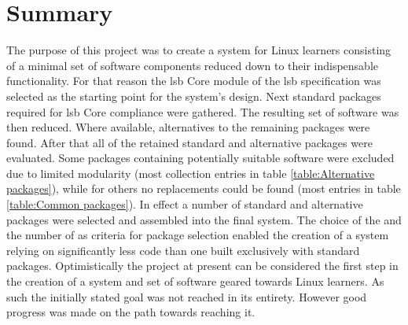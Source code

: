 \section{Summary}\label{Summary}

The purpose of this project was to create a system for Linux learners consisting of a minimal set of software components reduced down to their indispensable functionality. For that reason the \gls{lsb} Core module of the \gls{lsb} specification was selected as the starting point for the system's design. Next standard packages required for \gls{lsb} Core compliance were gathered. The resulting set of software was then reduced. Where available, alternatives to the remaining packages were found. After that all of the retained standard and alternative packages were evaluated. Some packages containing potentially suitable software were excluded due to limited modularity (most collection entries in table \ref{table:Alternative packages}), while for others no replacements could be found (most entries in table \ref{table:Common packages}). In effect a number of standard and alternative packages were selected and assembled into the final system. The choice of the  and the number of  as criteria for package selection enabled the creation of a system relying on significantly less code than one built exclusively with standard packages. Optimistically the project at present can be considered the first step in the creation of a system and set of software geared towards Linux learners. As such the initially stated goal was not reached in its entirety. However good progress was made on the path towards reaching it.
